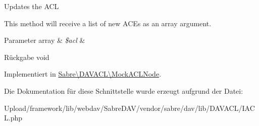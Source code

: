 Updates the A\+CL

This method will receive a list of new A\+CE\textquotesingle{}s as an array argument.


\begin{DoxyParams}[1]{Parameter}
array & {\em \$acl} & \\
\hline
\end{DoxyParams}
\begin{DoxyReturn}{Rückgabe}
void 
\end{DoxyReturn}


Implementiert in \mbox{\hyperlink{class_sabre_1_1_d_a_v_a_c_l_1_1_mock_a_c_l_node_a97023e609682d3ed8b6df9ef6d2004eb}{Sabre\textbackslash{}\+D\+A\+V\+A\+C\+L\textbackslash{}\+Mock\+A\+C\+L\+Node}}.



Die Dokumentation für diese Schnittstelle wurde erzeugt aufgrund der Datei\+:\begin{DoxyCompactItemize}
\item 
Upload/framework/lib/webdav/\+Sabre\+D\+A\+V/vendor/sabre/dav/lib/\+D\+A\+V\+A\+C\+L/I\+A\+C\+L.\+php\end{DoxyCompactItemize}
